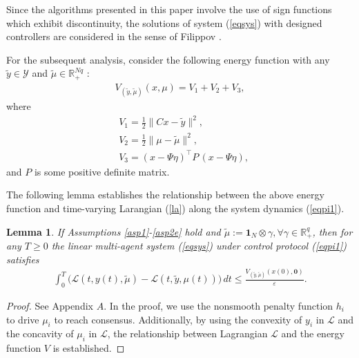 \documentclass[final,5p,times,twocolumn,authoryear]{elsarticle}
\newtheorem{lemma}{ {Lemma}}
\begin{document}
	\begin{remark}
		Since the algorithms presented in this paper involve the use of sign functions which exhibit discontinuity, the solutions of system (\ref{eqsys}) with designed controllers are considered in the sense of Filippov \citep{dis1988}.
	\end{remark}
	
	For the subsequent analysis, consider the following energy function with any $\tilde{y}\in\mathcal{Y}$ and $\tilde{\mu}\in\mathbb{R}_+^{Nq}$ :
	\begin{align}
		V_{(\tilde{y}, \tilde{\mu})}(x,\mu)=V_1 + V_2 + V_3,\label{v1}
	\end{align}
	where
	\begin{subequations}%
		\begin{align}
			&V_1=\frac{1}{2}\|Cx-\tilde{y}\|^2,\label{v1a}\\
			&V_2=\frac{1}{2}\|\mu-\tilde{\mu}\|^2,\label{v1b}\\
			&V_3=(x-\Psi\eta)^\top P\, (x-\Psi\eta),
		\end{align}
	\end{subequations}
	and $P$ is some positive definite matrix.
	
	The following lemma establishes the relationship between the above energy function and time-varying Larangian (\ref{la}) along the system dynamics (\ref{eqpi1}).
	
	
	\begin{lemma}\label{lemma4}
		If Assumptions \ref{asp1}-\ref{asp2e} hold and $\tilde{\mu}:= \boldsymbol1_N \otimes \gamma, \forall \gamma\in \mathbb{R}_+^q$, then for any $T\ge0$ the linear multi-agent system (\ref{eqsys}) under control protocol (\ref{eqpi1}) satisfies
		\begin{align}
			\int_{0}^{T} \Big( \mathcal{L}(t,y(t),\tilde{\mu})-\mathcal{L}(t,\tilde{y},\mu(t)) \Big) \,dt\le\frac{V_{(\tilde{y}, \tilde{\mu})}(x(0), \boldsymbol{0})}{\varepsilon}.\label{l3}
		\end{align}
	\end{lemma}
	
	\begin{proof}
		See Appendix $A$.  In the proof, we use the nonsmooth penalty function $h_i$ to drive $\mu_i$ to reach consensus. Additionally, by using the convexity of $y_i$ in $\mathcal{L}$ and the concavity of $\mu_i$ in $\mathcal{L}$, the relationship between Lagrangian $\mathcal{L}$ and the energy function $V$ is established.	
	\end{proof}
	
\end{document}
